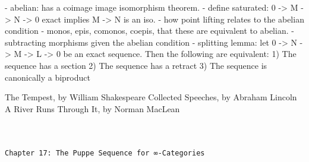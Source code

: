 \documentclass{book}
\theoremstyle{definition}
\renewcommand{\chapter}[1]{
\newpage
{
\Huge 
\begin{center}
\ \\
\ \\
\thispagestyle{empty}
\texttt{#1}
\end{center}}
\ \\
\ \\
}
\begin{document}
- abelian: has a coimage image isomorphism theorem.
- define saturated: 0 -> M -> N -> 0 exact implies M -> N is an iso.
- how point lifting relates to the abelian condition
- monos, epis, comonos, coepis, that these are equivalent to abelian.
- subtracting morphisms given the abelian condition
- splitting lemma: let 0 -> N -> M -> L -> 0 be an exact sequence. Then the following are equivalent:
1) The sequence has a section
2) The sequence has a retract
3) The sequence is canonically a biproduct
\fi

The Tempest, by William Shakespeare
Collected Speeches, by Abraham Lincoln
A River Runs Through It, by Norman MacLean











\chapter{Chapter 17: The Puppe Sequence for ∞-Categories}
\end{document}
